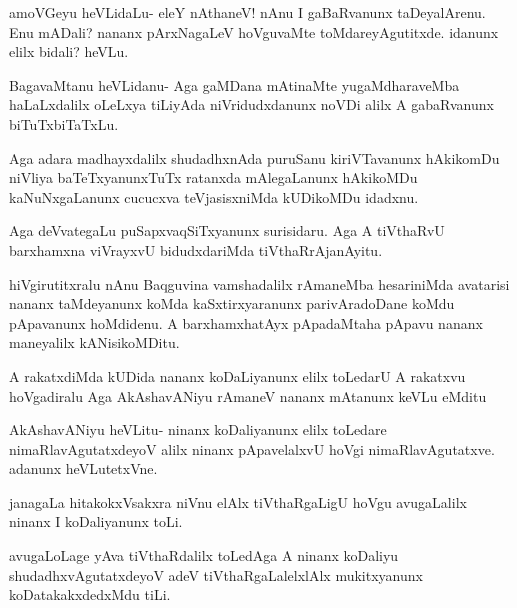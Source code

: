 \documentclass{article}
\begin{document}
\begin{mng}%
amoVGeyu heVLidaLu- eleY nAthaneV! nAnu I gaBaRvanunx
taDeyalArenu. Enu mADali? nananx pArxNagaLeV hoVguvaMte toMdareyAgutitxde.
idanunx elilx bidali? heVLu.
\end{mng}

\begin{mng}%
BagavaMtanu heVLidanu- Aga gaMDana mAtinaMte yugaMdharaveMba
haLaLxdalilx oLeLxya tiLiyAda niVridudxdanunx noVDi alilx A gabaRvanunx
biTuTxbiTaTxLu.
\end{mng}

\begin{mng}%
Aga adara madhayxdalilx shudadhxnAda puruSanu kiriVTavanunx hAkikomDu
niVliya baTeTxyanunxTuTx ratanxda mAlegaLanunx hAkikoMDu kaNuNxgaLanunx
cucucxva teVjasisxniMda kUDikoMDu idadxnu.
\end{mng}

\begin{mng}%
Aga deVvategaLu puSapxvaqSiTxyanunx surisidaru. Aga A tiVthaRvU
barxhamxna viVrayxvU bidudxdariMda tiVthaRrAjanAyitu.
\end{mng}

\begin{mng}%
hiVgirutitxralu nAnu Baqguvina vamshadalilx rAmaneMba hesariniMda
avatarisi nananx taMdeyanunx koMda kaSxtirxyaranunx parivAradoDane 
koMdu pApavanunx hoMdidenu. A barxhamxhatAyx pApadaMtaha pApavu nananx
maneyalilx kANisikoMDitu.
\end{mng}

\begin{mng}%
A rakatxdiMda kUDida nananx koDaLiyanunx elilx toLedarU A
rakatxvu hoVgadiralu Aga AkAshavANiyu rAmaneV nananx mAtanunx keVLu
eMditu
\end{mng}

\begin{mng}%
AkAshavANiyu heVLitu- ninanx koDaliyanunx elilx toLedare
nimaRlavAgutatxdeyoV alilx ninanx pApavelalxvU hoVgi nimaRlavAgutatxve.
adanunx heVLutetxVne.
\end{mng}

\begin{mng}%
janagaLa hitakokxVsakxra niVnu elAlx tiVthaRgaLigU hoVgu avugaLalilx
ninanx I koDaliyanunx toLi.
\end{mng}

\begin{mng}%
avugaLoLage yAva tiVthaRdalilx toLedAga A ninanx koDaliyu
shudadhxvAgutatxdeyoV adeV tiVthaRgaLalelxlAlx mukitxyanunx koDatakakxdedxMdu tiLi.
\end{mng}
\end{document}
